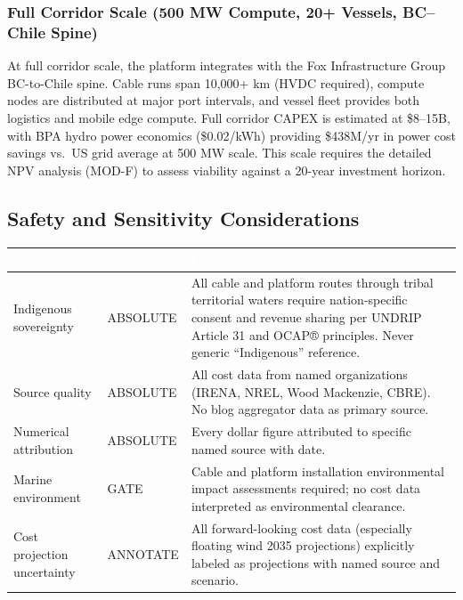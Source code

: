 \documentclass[11pt,letterpaper]{article}
\newcommand{\tableheader}[1]{\textbf{\sffamily\textcolor{white}{#1}}}
\begin{document}
\subsubsection{Full Corridor Scale (500 MW Compute, 20+ Vessels, BC--Chile Spine)}

At full corridor scale, the platform integrates with the Fox Infrastructure Group
BC-to-Chile spine. Cable runs span 10,000+ km (HVDC required), compute nodes are
distributed at major port intervals, and vessel fleet provides both logistics and
mobile edge compute. Full corridor CAPEX is estimated at \$8--15B, with BPA hydro
power economics (\$0.02/kWh) providing \$438M/yr in power cost savings vs.\ US
grid average at 500 MW scale. This scale requires the detailed NPV analysis
(MOD-F) to assess viability against a 20-year investment horizon.

\subsection{Safety and Sensitivity Considerations}

\begin{center}
\begin{tabularx}{\textwidth}{L{4cm}L{2.5cm}X}
\toprule
{}
\tableheader{Area} & \tableheader{Type} & \tableheader{Consideration} \\
\midrule
Indigenous sovereignty & ABSOLUTE & All cable and platform routes through tribal territorial waters require nation-specific consent and revenue sharing per UNDRIP Article 31 and OCAP® principles. Never generic ``Indigenous'' reference. \\
Source quality & ABSOLUTE & All cost data from named organizations (IRENA, NREL, Wood Mackenzie, CBRE). No blog aggregator data as primary source. \\
Numerical attribution & ABSOLUTE & Every dollar figure attributed to specific named source with date. \\
Marine environment & GATE & Cable and platform installation environmental impact assessments required; no cost data interpreted as environmental clearance. \\
Cost projection uncertainty & ANNOTATE & All forward-looking cost data (especially floating wind 2035 projections) explicitly labeled as projections with named source and scenario. \\
\bottomrule
\end{tabularx}
\end{center}
\end{document}

